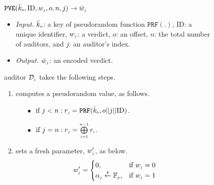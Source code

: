 \begin{figure}[!htbp]
\setlength{\fboxsep}{1pt}
\begin{center}
    \begin{tcolorbox}[enhanced,width=5.5in, height=57mm,
    drop fuzzy shadow southwest,
    colframe=black,colback=white]
   { \small{
    \vspace{-2.1mm}
\underline{$\mathtt{PVE}(\bar{k}_{\scriptscriptstyle 0}, \text{ID},  w_{\scriptscriptstyle j}, o, n,  j)\rightarrow  \bar{  w}_{\scriptscriptstyle j}$}\\
%
    \vspace{-2.1mm}
\begin{itemize}
\item \noindent\textit{Input.} $\bar{k}_{\scriptscriptstyle 0}$: a key of  pseudorandom function $\mathtt{PRF}(.)$, $\text{ID}$: a unique identifier, $ w_{\scriptscriptstyle j}$: a  verdict, $o$: an offset, $n$: the total number of  auditors,  and  $j$: an auditor's index.
%
\item \noindent\textit{Output.} $\bar{  w}_{\scriptscriptstyle j}$:  an  encoded verdict.  
%
\end{itemize}
auditor $\mathcal{D}_{\scriptscriptstyle j}$ takes the following steps.
    \vspace{-1.2mm}
\begin{enumerate}
%
\item\label{ZSPA:val-gen} computes a  pseudorandom  value,  as follows. 
%
\begin{itemize}
%
\item[$\bullet$]$ \text{ if } j< n: r_{\scriptscriptstyle j}=\mathtt{PRF}(\bar k_{\scriptscriptstyle 0}, o||j||\text{ID})$.\\
%
    \vspace{-1.6mm}
\item [$\bullet$] $ \text{ if } j=n: r_{\scriptscriptstyle j}= \bigoplus\limits^{\scriptscriptstyle n-1}_{\scriptscriptstyle i=1} r_{\scriptscriptstyle i}$.
%
\end{itemize}
%
\item  sets a fresh parameter, $w'_{\scriptscriptstyle j}$, as below. 
%
    \vspace{-1.5mm}
\begin{equation*}
   w'_{\scriptscriptstyle j}= 
\begin{cases}
   0,              & \text{if } w_{\scriptscriptstyle j}=0\\
   \alpha_{\scriptscriptstyle j}\stackrel{\scriptscriptstyle\$}\leftarrow \mathbb{F}_{\scriptscriptstyle p} ,& \text{if } w_{\scriptscriptstyle j}=1\\

\end{cases}
\end{equation*}
%


\end{enumerate}}}
\end{tcolorbox}
\end{center}
\end{figure}
